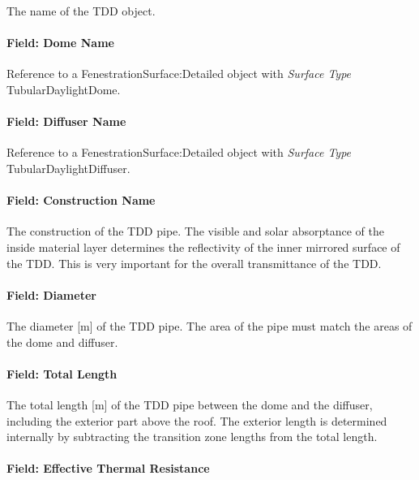 The name of the TDD object.

\paragraph{Field: Dome Name}\label{field-dome-name}

Reference to a FenestrationSurface:Detailed object with \emph{Surface Type} TubularDaylightDome.

\paragraph{Field: Diffuser Name}\label{field-diffuser-name}

Reference to a FenestrationSurface:Detailed object with \emph{Surface Type} TubularDaylightDiffuser.

\paragraph{Field: Construction Name}\label{field-construction-name-001}

The construction of the TDD pipe. The visible and solar absorptance of the inside material layer determines the reflectivity of the inner mirrored surface of the TDD. This is very important for the overall transmittance of the TDD.

\paragraph{Field: Diameter}\label{field-diameter}

The diameter {[}m{]} of the TDD pipe. The area of the pipe must match the areas of the dome and diffuser.

\paragraph{Field: Total Length}\label{field-total-length}

The total length {[}m{]} of the TDD pipe between the dome and the diffuser, including the exterior part above the roof. The exterior length is determined internally by subtracting the transition zone lengths from the total length.

\paragraph{Field: Effective Thermal Resistance}\label{field-effective-thermal-resistance}

